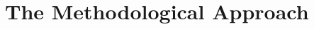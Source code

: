 \documentclass[10pt]{article}
\begin{document}
\section{The Methodological Approach}
\end{document}
